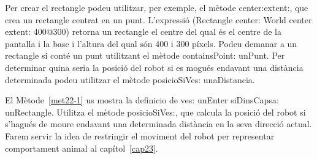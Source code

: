Per crear el rectangle podeu utilitzar, per exemple, el mètode \textsf{center:extent:}, que crea un rectangle centrat en un punt. L'expressió \textsf{(Rectangle center: World center extent: 400@300)} retorna un rectangle  el centre del qual és el centre de la pantalla i la base i l'altura del qual són 400 i 300 píxels. Podeu demanar a un rectangle si conté un punt utilitzant el mètode \textsf{containsPoint: unPunt}. Per determinar quina seria la posició del robot si es mogués endavant una distància determinada podeu utilitzar el mètode \textsf{posicioSiVes: unaDistancia}. 

El Mètode~\ref{met22-1} us mostra la definicio de \textsf{ves: unEnter siDinsCapsa: unRectangle}. Utilitza el mètode \textsf{posicioSiVes:}, que calcula la posició del robot si s'hagués de moure endavant una determinada distància en la seva direcció actual. Farem servir la idea de restringir el moviment del robot per representar comportament animal al capítol~\ref{cap23}.


